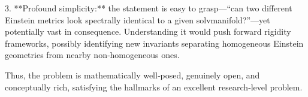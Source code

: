 3. **Profound simplicity:** the statement is easy to grasp—“can two different Einstein metrics look spectrally identical to a given solvmanifold?”—yet potentially vast in consequence. Understanding it would push forward rigidity frameworks, possibly identifying new invariants separating homogeneous Einstein geometries from nearby non‑homogeneous ones.  

Thus, the problem is mathematically well‑posed, genuinely open, and conceptually rich, satisfying the hallmarks of an excellent research‑level problem.